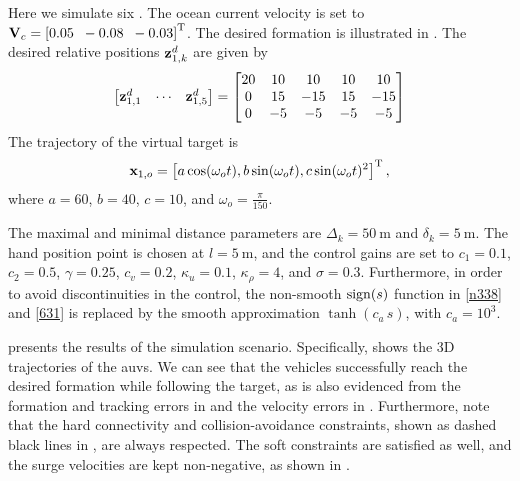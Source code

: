 Here we simulate six .
The ocean current velocity is set to $\mathbf{V}_c= \left[0.05\;\;-0.08\;\;-0.03\right]^{\mathrm{T}}$.
The desired formation is illustrated in .
The desired relative positions $\mathbf{z}_{1, k}^d$ are given by
\begin{equation}
	\begin{bmatrix}
		\mathbf{z}_{1, 1}^d & \cdots & \mathbf{z}_{1, 5}^d
	\end{bmatrix}
	=
	\begin{bmatrix}
		20 & 10 & 10 & 10 & 10\\ 0 & 15 & -15 & 15 & -15\\ 0 & -5 & -5 & -5 & -5
	\end{bmatrix}
\end{equation}
The trajectory of the virtual target is
\begin{equation}
	\mathbf{x}_{1, o} = \left[a \cos(\omega_o t), b \sin(\omega_o t), c \sin(\omega_o t)^2\right]^{\mathrm{T}},
\end{equation}
where $a = 60$, $b = 40$, $c = 10$, and $\omega_o = \frac{\pi}{150}$.

The maximal and minimal distance parameters are $\Delta_k=\SI{50}{\meter}$ and $\delta_k=\SI{5}{\meter}$.
The hand position point is chosen at $l=\SI{5}{\meter}$, and the control gains are set to $c_1=0.1$, $c_2=0.5$, $\gamma=0.25$, $c_v=0.2$, $\kappa_u=0.1$, $\kappa_\rho=4$, and $\sigma=0.3$.
Furthermore, in order to avoid discontinuities in the control, the non-smooth ${\rm sign}(s)$ function in \eqref{n338} and \eqref{631} is replaced by the smooth approximation $\tanh\left(c_a\, s\right)$, with $c_a = 10^3$.

 presents the results of the simulation scenario.
Specifically,  shows the 3D trajectories of the \glspl{auv}.
We can see that the vehicles successfully reach the desired formation while following the target, as is also evidenced from the formation and tracking errors in  and the velocity errors in .
Furthermore, note that the hard connectivity and collision-avoidance constraints, shown as dashed black lines in , are always respected.
The soft constraints are satisfied as well, and the surge velocities are kept non-negative, as shown in .

